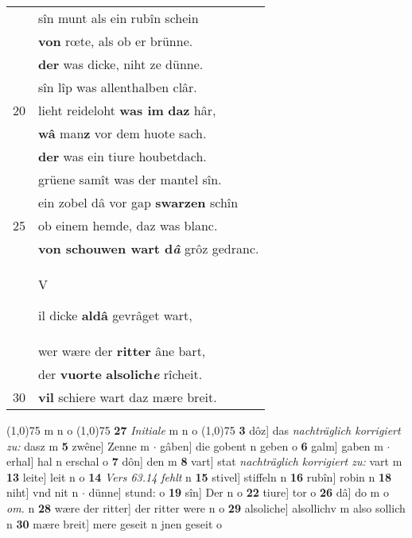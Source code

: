 \documentclass[8pt,a4paper,notitlepage]{article}
\begin{document}
\begin{table}[ht]
\begin{minipage}[t]{0.5\linewidth}
\begin{tabular}{rl}
 & sîn munt als ein rubîn schein\\ 
 & \textbf{von} rœte, als ob er brünne.\\ 
 & \textbf{der} was dicke, niht ze dünne.\\ 
 & sîn lîp was allenthalben clâr.\\ 
20 & lieht reideloht \textbf{was im} \textbf{daz} hâr,\\ 
 & \textbf{wâ} man\textbf{z} vor dem huote sach.\\ 
 & \textbf{der} was ein tiure houbetdach.\\ 
 & grüene samît was der mantel sîn.\\ 
 & ein zobel dâ vor gap \textbf{swarzen} schîn\\ 
25 & ob einem hemde, daz was blanc.\\ 
 & \textbf{von schouwen wart d\textit{â}} grôz gedranc.\\ 
 & \begin{large}V\end{large}il dicke \textbf{aldâ} gevrâget wart,\\ 
 & wer wære der \textbf{ritter} âne bart,\\ 
 & der \textbf{vuorte} \textbf{alsolich\textit{e}} rîcheit.\\ 
30 & \textbf{vil} schiere wart daz mære breit.\\ 
\end{tabular}
\scriptsize
\line(1,0){75} \newline
m n o \newline
\line(1,0){75} \newline
\textbf{27} \textit{Initiale} m n o  \newline
\line(1,0){75} \newline
\textbf{3} dôz] das \textit{nachträglich korrigiert zu:} dasz m \textbf{5} zwêne] Zenne m  $\cdot$ gâben] die gobent n geben o \textbf{6} galm] gaben m  $\cdot$ erhal] hal n erschal o \textbf{7} dôn] den m \textbf{8} vart] stat \textit{nachträglich korrigiert zu:} vart m \textbf{13} leite] leit n o \textbf{14} \textit{Vers 63.14 fehlt} n  \textbf{15} stivel] stiffeln n \textbf{16} rubîn] robin n \textbf{18} niht] vnd nit n  $\cdot$ dünne] stund: o \textbf{19} sîn] Der n o \textbf{22} tiure] tor o \textbf{26} dâ] do m o \textit{om.} n \textbf{28} wære der ritter] der ritter were n o \textbf{29} alsoliche] alsollichv m also sollich n \textbf{30} mære breit] mere geseit n jnen geseit o \newline
\end{minipage}
\end{table}
\end{document}
